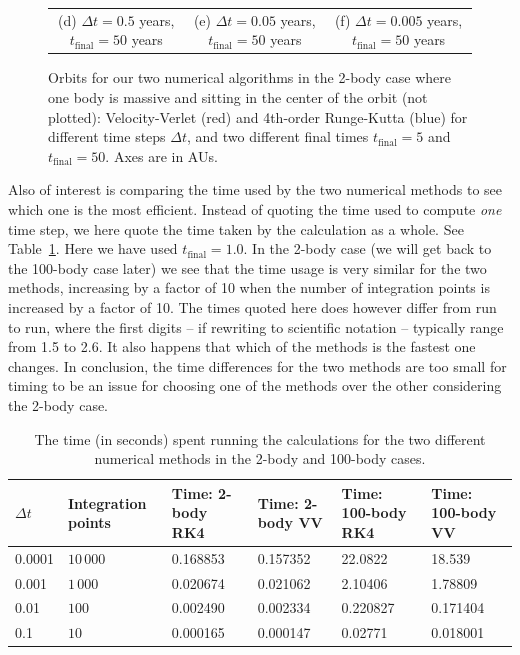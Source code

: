 \documentclass{article}
\begin{document}
\begin{multicols}{2}
\begin{figure}
\begin{center}
\begin{tabular}{ccc}
	(d) $\Delta t = 0.5$ years, $t_{\mathrm{final}} = 50$ years		&(e) $\Delta t = 0.05$ years, $t_{\mathrm{final}} = 50$ years 	& (f) $\Delta t = 0.005$ years, $t_{\mathrm{final}} = 50$ years  \\[6pt]
\end{tabular}
\caption{Orbits for our two numerical algorithms in the 2-body case where one body is massive and sitting in the center of the orbit (not plotted): Velocity-Verlet (red) and 4th-order Runge-Kutta (blue) for different time steps $\Delta t$, and two different final times $t_{\mathrm{final}} = 5$ and $t_{\mathrm{final}} = 50$. Axes are in AUs.}\label{fig:2_body}
\end{center}
\end{figure}
Also of interest is comparing the time used by the two numerical methods to see which one is the most efficient. Instead of quoting the time used to compute \textit{one} time step, we here quote the time taken by the calculation as a whole. See Table~\ref{table:times}. Here we have used $t_{\mathrm{final}} = 1.0$. In the 2-body case (we will get back to the 100-body case later) we see that the time usage is very similar for the two methods, increasing by a factor of 10 when the number of integration points is increased by a factor of 10. The times quoted here does however differ from run to run, where the first digits -- if rewriting to scientific notation -- typically range from 1.5 to 2.6. It also happens that which of the methods is the fastest one changes. In conclusion, the time differences for the two methods are too small for timing to be an issue for choosing one of the methods over the other considering the 2-body case.

\begin{table}
\begin{center}
\begin{tabular}{ l l l l l l}\hline
	$\Delta t$ 				& Integration points	 	& Time: 2-body RK4			& Time: 2-body VV			& Time: 100-body RK4 		& Time: 100-body VV	\\ \hline
	0.0001 				& $10\,000$ 			& 0.168853				& 0.157352				& 22.0822					& 18.539		 \\
	0.001 				& $1\,000$ 			& 0.020674				& 0.021062				& 2.10406					& 1.78809		 \\
	0.01 					& $100$ 				& 0.002490				& 0.002334				& 0.220827				& 0.171404	 \\
	0.1 					& $10$				& 0.000165				& 0.000147				& 0.02771					& 0.018001		 \\
	\hline
\end{tabular}
\caption{The time (in seconds) spent running the calculations for the two different numerical methods in the 2-body and 100-body cases.}\label{table:times}
\end{center}
\end{table}


\end{multicols}
\end{document}
